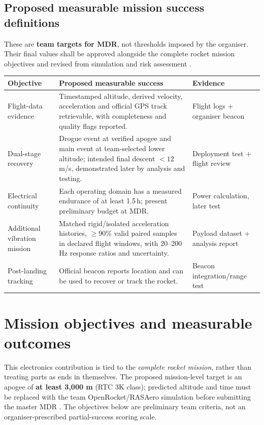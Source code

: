 \subsection*{Proposed measurable mission success definitions}
These are \textbf{team targets for MDR}, not thresholds imposed by the organiser. Their final values shall be approved alongside the complete rocket mission objectives and revised from simulation and risk assessment \cite{rtc2027app01,rtc2027app07}.
\small
\begin{tabularx}{\linewidth}{@{}L{32mm}Y L{37mm}@{}}
\toprule{}\textbf{Objective}&\textbf{Proposed measurable success}&\textbf{Evidence}\\\midrule
Flight-data evidence & Timestamped altitude, derived velocity, acceleration and official GPS track retrievable, with completeness and quality flags reported. & Flight logs + organiser beacon\\
Dual-stage recovery & Drogue event at verified apogee and main event at team-selected lower altitude; intended final descent $<12$\,m/s, demonstrated later by analysis and testing. & Deployment test + flight review\\
Electrical continuity & Each operating domain has a measured endurance of at least 1.5\,h; present preliminary budget at MDR. & Power calculation, later test\\
Additional vibration mission & Matched rigid/isolated acceleration histories, $\ge90\%$ valid paired samples in declared flight windows, with 20--200 Hz response ratios and uncertainty. & Payload dataset + analysis report\\
Post-landing tracking & Official beacon reports location and can be used to recover or track the rocket. & Beacon integration/range test\\
\bottomrule
\end{tabularx}
\normalsize


\section{Mission objectives and measurable outcomes}
\label{sec:missionobjectives}
This electronics contribution is tied to the \emph{complete rocket mission}, rather than treating parts as ends in themselves. The proposed mission-level target is an apogee of \textbf{at least 3,000 m} (RTC 3K class); predicted altitude and time must be replaced with the team OpenRocket/RASAero simulation before submitting the master MDR \cite{rtc2027app03,rtc2027app01}. The objectives below are preliminary team criteria, not an organiser-prescribed partial-success scoring scale.

